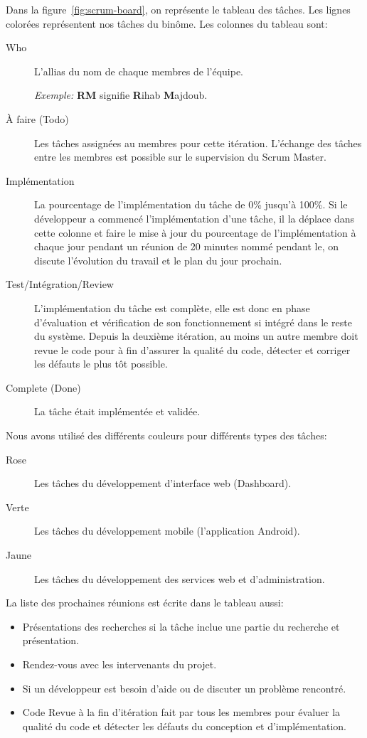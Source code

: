 Dans la figure~\ref{fig:scrum-board}, on représente le tableau des tâches. Les
lignes colorées représentent nos tâches du binôme. Les colonnes du tableau
sont:

\begin{description}
    \item [Who] L'allias du nom de chaque membres de l'équipe.

        \emph{Exemple:} \textbf{RM} signifie \textbf{R}ihab \textbf{M}ajdoub.
    \item [À faire (Todo)] Les tâches assignées au membres pour cette itération.
        L'échange des tâches entre les membres est possible sur le supervision
        du Scrum Master.
    \item [Implémentation] La pourcentage de l'implémentation du tâche de 0\%
        jusqu'à 100\%. Si le développeur a commencé l'implémentation d'une
        tâche, il la déplace dans cette colonne et faire le mise à jour du
        pourcentage de l'implémentation à chaque jour pendant un réunion de 20
        minutes nommé  pendant le, on discute
        l'évolution du travail et le plan du jour prochain.
    \item [Test/Intégration/Review] L'implémentation du tâche est complète,
        elle est donc en phase d'évaluation et vérification de son
        fonctionnement si intégré dans le reste du système. Depuis la deuxième
        itération, au moins un autre membre doit revue le code pour à fin
        d'assurer la qualité du code, détecter et corriger les défauts le plus
        tôt possible.
    \item [Complete (Done)] La tâche était implémentée et validée.
\end{description}

Nous avons utilisé des différents couleurs pour différents types des tâches:

\begin{description}
    \item [Rose] Les tâches du développement d'interface web (Dashboard).
    \item [Verte] Les tâches du développement mobile (l'application Android).
    \item [Jaune] Les tâches du développement des services web et
        d'administration.
\end{description}

La liste des prochaines réunions est écrite dans le tableau aussi:

\begin{itemize}
    \item Présentations des recherches si la tâche inclue une partie du
        recherche et présentation.
    \item Rendez-vous avec les intervenants du projet.
    \item Si un développeur est besoin d'aide ou de discuter un problème
        rencontré.
    \item Code Revue à la fin d'itération fait par tous les membres pour
        évaluer la qualité du code et détecter les défauts du conception et
        d'implémentation.
\end{itemize}

